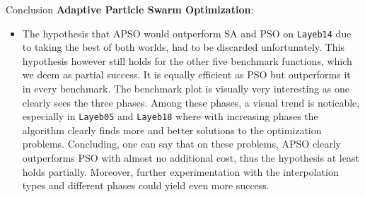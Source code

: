 \documentclass[11pt,aspectratio=169]{beamer}
\begin{document}
\begin{closingframe}{Conclusion}
    \textbf{Adaptive Particle Swarm Optimization}:
    \begin{itemize}
        \item The hypothesis that APSO would outperform SA and PSO on \texttt{Layeb14} due to taking the best of both worlds, had to be discarded unfortunately. This hypothesis however still holds for the other five benchmark functions, which we deem as partial success. It is equally efficient as PSO but outperforms it in every benchmark. The benchmark plot is visually very interesting as one clearly sees the three phases. Among these phases, a visual trend is noticable, especially in \texttt{Layeb05} and \texttt{Layeb18} where with increasing phases the algorithm clearly finds more and better solutions to the optimization problems. Concluding, one can say that on these problems, APSO clearly outperforms PSO with almost no additional cost, thus the hypothesis at least holds partially. Moreover, further experimentation with the interpolation types and different phases could yield even more success.
    \end{itemize}
\end{closingframe}
\end{document}
